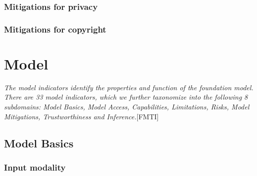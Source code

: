 \documentclass{article}
\begin{document}
\subsubsection{Mitigations for privacy}


\subsubsection{Mitigations for copyright}


\section{Model}
\textit{The model indicators identify the properties and function of the foundation model. There are 33 model indicators, which we further taxonomize into the following 8 subdomains: Model Basics, Model Access, Capabilities, Limitations, Risks, Model Mitigations, Trustworthiness and Inference.}[FMTI]


\subsection{Model Basics}
\subsubsection{Input modality}
\end{document}
